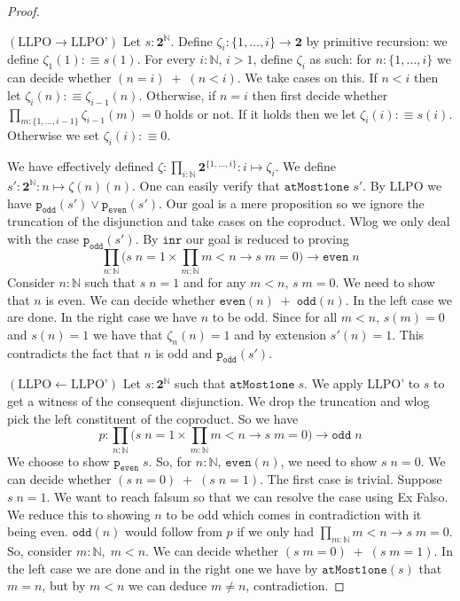 \documentclass[12pt]{report}
\theoremstyle{definition}
\begin{document}
\begin{proof}~

$(\text{LLPO} \rightarrow \text{LLPO'})$ Let $s : \mathbf{2}^\mathbb{N}$. 
Define $\zeta_i : \{1,\ldots,i\} \rightarrow \mathbf{2}$ by primitive recursion: we define $\zeta_1 (1) :\equiv s(1)$. 
For every $i : \mathbb{N}$, $i  >1$, define $\zeta_i$ as such: for $n : \{ 1,\ldots,i \}$ we can decide whether $(n=i)\;+\;(n < i)$. 
We take cases on this. 
If $n < i$ then let $\zeta_i(n) : \equiv \zeta_{i-1}(n)$. 
Otherwise, if $n = i$ then first decide whether $\prod_{m : \{1,\ldots,i-1\}}\zeta_{i-1}(m) = 0$ holds or not. 
If it holds then we let $\zeta_{i}(i) :\equiv s(i)$. 
Otherwise we set $\zeta_i(i) : \equiv 0$. 

We have effectively defined $\zeta : \prod_{i : \mathbb{N}} \mathbf{2}^{\{ 1,\ldots,i \}} : i \mapsto \zeta_i$. 
We define $s' : \mathbf{2}^\mathbb{N} : n \mapsto \zeta(n)(n)$. 
One can easily verify that $\mathtt{atMost1one}\; s'$. 
By LLPO we have $\mathtt{p_{odd}}(s') \vee \mathtt{p_{even}}(s')$. 
Our goal is a mere proposition so we ignore the truncation of the disjunction and take cases on the coproduct. 
Wlog we only deal with the case $\mathtt{p_{odd}}(s')$. 
By $\mathtt{inr}$ our goal is reduced to proving
$$\prod_{n : \mathbb{N}} \big( s\;n = 1 \times \prod_{m : \mathbb{N}} m < n \rightarrow s\;m=0 \big) \rightarrow \mathtt{even}\;n$$
Consider $n : \mathbb{N}$ such that $s\;n = 1$ and for any $m < n$, $s\;m=0$. 
We need to show that $n$ is even. 
We can decide whether $\mathtt{even}(n)\; +\;\mathtt{odd}(n) $. 
In the left case we are done. 
In the right case we have $n$ to be odd. 
Since for all $m < n$, $s(m) = 0$ and $s(n) =1$ we have that $\zeta_n(n) = 1$ and by extension $s'(n) = 1$. 
This contradicts the fact that $n$ is odd and $\mathtt{p_{odd}}(s')$. 

$(\text{LLPO} \leftarrow \text{LLPO'})$ Let $s : \mathbf{2}^\mathbb{N}$ such that $\mathtt{atMost1one}\; s$. 
We apply LLPO' to $s$ to get a witness of the consequent disjunction. 
We drop the truncation and wlog pick the left constituent of the coproduct. 
So we have 
$$p : \prod_{n : \mathbb{N}} \big( s\;n = 1 \times \prod_{m : \mathbb{N}} m < n \rightarrow s\;m=0 \big) \rightarrow \mathtt{odd}\;n$$
We choose to show $\mathtt{p_{even}}\; s$. 
So, for $n : \mathbb{N}$, $\mathtt{even}(n)$, we need to show $s\; n = 0$. 
We can decide whether $(s\;n= 0)\;+\;(s\;n = 1)$. 
The first case is trivial. 
Suppose $s\;n = 1$. 
We want to reach falsum so that we can resolve the case using Ex Falso. 
We reduce this to showing $n$ to be odd which comes in contradiction with it being even. 
$\mathtt{odd}(n)$ would follow from $p$ if we only had $\prod_{m : \mathbb{N}}m < n \rightarrow s\;m = 0$. 
So, consider $m : \mathbb{N},\;m < n$. 
We can decide whether $(s\;m = 0)\;+\;(s\;m = 1)$. 
In the left case we are done and in the right one we have by $\mathtt{atMost1one}(s)$ that $m = n$, but by $m< n$ we can deduce $m\neq n$, contradiction.
\end{proof}
\end{document}
